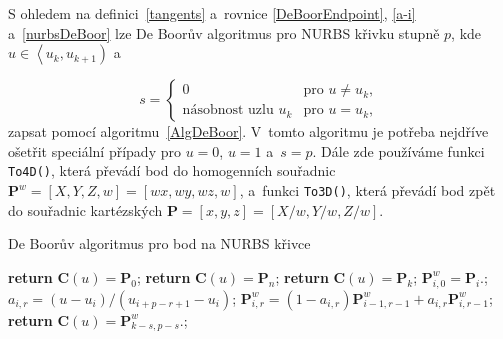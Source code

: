 S ohledem na definici~\ref{tangents} a~rovnice \eqref{DeBoorEndpoint}, \eqref{a-i} a~\eqref{nurbsDeBoor} lze De Boorův algoritmus pro NURBS křivku stupně $p$, kde $u\in\left\langle u_k, u_{k+1}\right)$ a~

\begin{equation}
s=
\begin{cases}
0 & \text{pro $u\neq u_k$},\\
\text{násobnost uzlu $u_k$} & \text{pro $u=u_k$},
\end{cases}
\end{equation}
zapsat pomocí algoritmu~\ref{AlgDeBoor}. V~tomto algoritmu je potřeba nejdříve ošetřit speciální případy pro $u=0$, $u=1$ a~$s=p$. Dále zde používáme funkci \texttt{To4D()}, která převádí bod do homogenních souřadnic $\mathbf{P}^w=\left[X,Y,Z,w\right]=\left[wx,wy,wz,w\right]$, a~funkci \texttt{To3D()}, která převádí bod zpět do souřadnic kartézských $\mathbf{P}=\left[x,y,z\right]=\left[X/w,Y/w,Z/w\right]$.
%		
%		
\begin{algorithm}[H]
	\caption{De Boorův algoritmus pro bod na NURBS křivce}
	\label{AlgDeBoor}
	\begin{algorithmic}[1]
		\State \textbf{return} $\mathbf{C}\left(u\right)=\mathbf{P}_0$;
		\EndIf
		\State \textbf{return} $\mathbf{C}\left(u\right)=\mathbf{P}_n$;
		\EndIf
		\State \textbf{return} $\mathbf{C}\left(u\right)=\mathbf{P}_k$;
		\EndIf
		\Statex
		\State $\mathbf{P}^w_{i,0}=\mathbf{P}_i$.;
		\EndFor
		\State $a_{i,r}=\left( u-u_i\right) /\left( u_{i+p-r+1}-u_i\right) $;
		\State $\mathbf{P}^w_{i,r}=\left(1-a_{i,r}\right)\mathbf{P}^w_{i-1,r-1}+a_{i,r}\mathbf{P}^w_{i,r-1}$;
		\EndFor
		\EndFor
		\State \textbf{return} $\mathbf{C}\left(u\right)=\mathbf{P}^w_{k-s,p-s}$.;
		\EndFunction
	\end{algorithmic}		
\end{algorithm}



